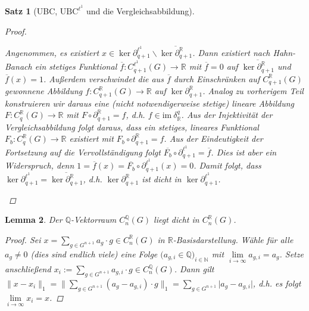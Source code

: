 \documentclass[a4paper,twoside,10pt]{scrreprt}
\newcommand {\img}{\text{im}~}
\newcommand{\N}{\mathbb{N}}
\newcommand{\Q}{\mathbb{Q}}
\newcommand{\R}{\mathbb{R}}
\newtheorem{satz}{Satz}[section]
\newtheorem{lemma}[satz]{Lemma}
\theoremstyle{definition}
\begin{document}
\begin{satz}[UBC, $\text{UBC}^{\ell^1}$ und die Vergleichsabbildung]
\begin{proof}
\begin{itemize}
Angenommen, es existiert $x\in \ker \partial_{q+1}^{\ell^1}\backslash\overline{\ker \partial_{q+1}^{\R}}$. Dann existiert nach Hahn-Banach ein stetiges Funktional $\overline{f}:C_{q+1}^{\ell^1}(G)\to \R$ mit $\overline{f}=0$ auf $\overline{\ker \partial_{q+1}^{\R}}$ und $\overline{f}(x)=1$. Außerdem verschwindet die aus $\overline{f}$ durch Einschränken auf $C_{q+1}^{\R}(G)$ gewonnene Abbildung $f:C_{q+1}^{\R}(G)\to \R$ auf $\ker \partial_{q+1}^{\R}$. Analog zu vorherigem Teil konstruieren wir daraus eine (nicht notwendigerweise stetige) lineare Abbildung $F:C_q^{\R}(G)\to \R$ mit $F\circ \partial_{q+1}^{\R}=f$, d.h. $f\in \img \delta_{\R}^q$. Aus der Injektivität der Vergleichsabbildung folgt daraus, dass ein stetiges, lineares Funktional $F_b:C_q^{\R}(G)\to \R$ existiert mit $F_b\circ \partial_{q+1}^{\R}=f$. Aus der Eindeutigkeit der Fortsetzung auf die Vervollständigung folgt $\overline{F_b}\circ \partial_{q+1}^{\ell^1}=\overline{f}$. Dies ist aber ein Widerspruch, denn $1=\overline{f}(x)=\overline{F_b}\circ \partial_{q+1}^{\ell^1}(x)=0$. Damit folgt, dass $\ker \partial_{q+1}^{\ell^1}=\overline{\ker \partial_{q+1}^{\R}}$, d.h. $\ker \partial_{q+1}^{\R}$ ist dicht in $\ker \partial_{q+1}^{\ell^1}$.
\end{itemize}
\end{proof}
\end{satz}

\begin{lemma}\label{lem:CQdenseInCR}
Der $\Q$-Vektorraum $C_{n}^{\Q}(G)$ liegt dicht in $C_{n}^{\R}(G)$.
\begin{proof}
Sei $x=\sum\limits_{g\in G^{n+1}} a_g\cdot g\in C_n^{\R}(G)$ in $\R$-Basisdarstellung. Wähle für alle $a_g\neq 0$ (dies sind endlich viele) eine Folge $\bigl(a_{g,i}\in \Q\bigr)_{i\in\N}$ mit $\lim\limits_{i\to \infty}a_{g,i}=a_g$. Setze anschließend $x_i:=\sum\limits_{g\in G^{n+1}}a_{g,i}\cdot g\in C_n^{\Q}(G)$. Dann gilt $\|x-x_i\|_1=\biggl\|\sum\limits_{g\in G^{n+1}}(a_g-a_{g,i})\cdot g\biggr\|_1=\sum\limits_{g\in G^{n+1}}\lvert a_g-a_{g,i}\rvert$, d.h. es folgt $\lim\limits_{i\to\infty}x_i=x$.
\end{proof}
\end{lemma}
\end{document}

